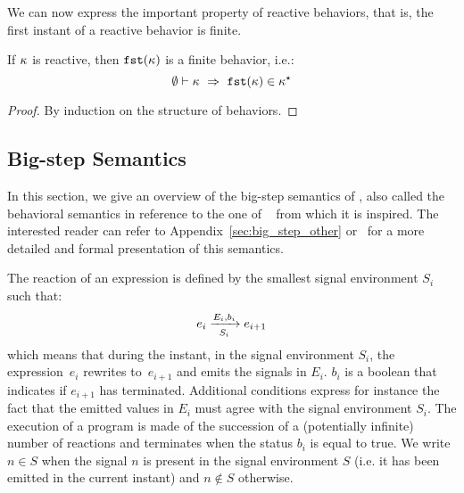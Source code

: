 \documentclass[9pt,preprint]{sigplanconf}
\begin{document}
We can now express the important property of reactive behaviors, that is, the first instant of a reactive behavior is finite.
\begin{property}
If $\rk$ is  reactive, then $\rkfst{\rk}$ is a finite behavior, i.e.:
\[ \wf{\emptyset}{\rk} \ \Rightarrow\  \rkfinite{\rkfst{\rk}} \]
\end{property}
\begin{proof}
By induction on the structure of behaviors.
\end{proof}

\subsection{Big-step Semantics}
\label{sec:semantics}

In this section, we give an overview of the big-step semantics of \rml{}, also called the behavioral semantics in reference to the one of \esterel~\cite{Berry:1996} from which it is inspired. The interested reader can refer to Appendix~\ref{sec:big_step_other} or~\cite{Mandel:2005} for a more detailed and formal presentation of this semantics.

The reaction of an expression is defined by the smallest signal environment $S_i$ such that:
\[ \bigstep{N}{e_i}{e_{i+1}}{E_i}{b_i}{S_i} \]
which means that during the instant, in the signal environment $S_i$, the expression~$e_i$ rewrites to~$e_{i+1}$ and emits the signals in $E_i$. $b_i$ is a boolean that indicates if $e_{i+1}$ has terminated. Additional conditions express for instance the fact that the emitted values in $E_i$ must agree with the signal environment $S_i$. The execution of a program is made of the succession of a (potentially infinite) number of reactions and terminates when the status $b_i$ is equal to true.
%
We write $n \in S$ when the signal $n$ is present in the signal environment $S$ (i.e. it has been emitted in the current instant) and $n \not\in S$ otherwise.
\end{document}
